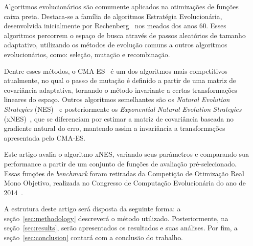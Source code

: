 Algoritmos evolucionários são comumente aplicados na otimizações de funções caixa preta.
Destaca-se a família de algoritmos Estratégia Evolucionária, desenvolvida inicialmente por Rechenberg~\cite{rechenberg65}
nos meados dos anos 60.
Esses algoritmos percorrem o espaço de busca através de passos aleatórios de tamanho adaptativo, utilizando os métodos de
evolução comuns a outros algoritmos evolucionários, como: seleção, mutação e recombinação.

Dentre esses métodos, o CMA-ES~\cite{hansen01} é um dos algoritmos mais competitivos atualmente, no qual o passo de
mutação é definido a partir de uma matriz de covariância adaptativa, tornando o método invariante a certas transformações
lineares do espaço.
Outros algoritmos semelhantes são os \textit{Natural Evolution Strategies} (NES)~\cite{wierstra08} e posteriormente
os \textit{Exponential Natural Evolution Strategies} (xNES)~\cite{glasmachers10}, que se diferenciam por estimar a matriz de
covariância baseada no gradiente natural do erro, mantendo assim a invariância a transformações apresentada pelo CMA-ES.

Este artigo avalia o algoritmo xNES, variando seus parâmetros e comparando sua performance a partir de um conjunto de
funções de avaliação pré-selecionado.
Essas funções de \textit{benchmark} foram retiradas da Competição de Otimização Real Mono Objetivo, realizada no Congresso
de Computação Evolucionária do ano de 2014~\cite{liang13}.

A estrutura deste artigo será disposta da seguinte forma: a seção~\ref{sec:methodology} descreverá o método utilizado.
Posteriormente, na seção~\ref{sec:results}, serão apresentados os resultados e suas análises. Por fim, a
seção~\ref{sec:conclusion} contará com a conclusão do trabalho.
